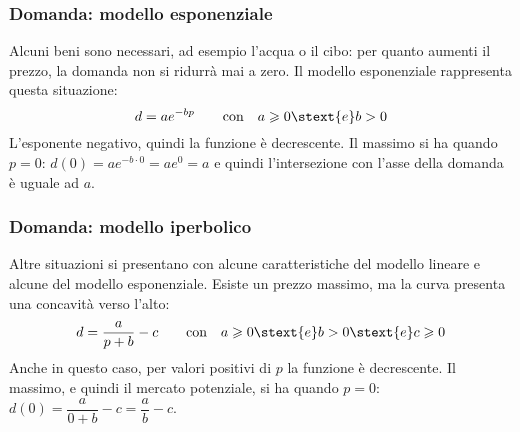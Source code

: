 \subsubsection{Domanda: modello esponenziale}

Alcuni beni sono necessari, ad esempio l'acqua o il cibo: per quanto aumenti 
il prezzo, la domanda non si ridurrà mai a zero.
Il modello esponenziale rappresenta questa situazione:
\[d= ae^{-bp} \qquad \text{con} \quad a \geqslant 0 \stext{ e } b > 0\]
L'esponente 
negativo, quindi la funzione è decrescente.
Il massimo si ha quando \(p = 0\): \(d(0) = ae^{-b\cdot 0} = ae^0 = a\) 
e quindi l'intersezione con l'asse della domanda è uguale ad \(a\).


\subsubsection{Domanda: modello iperbolico}

Altre situazioni si presentano con alcune caratteristiche del modello lineare 
e alcune del modello esponenziale. 
Esiste un prezzo massimo, ma la curva presenta una concavità verso l'alto:
\[d = \dfrac{a}{p+b}-c \qquad \text{con} \quad a \geqslant 0 \stext{ e } b 
> 0 \stext{ e } c \geqslant 0\]
Anche in questo caso, per valori positivi di \(p\) la funzione è decrescente.
Il massimo, e quindi il mercato potenziale, si ha quando 
\(p = 0\): \(d(0) = \dfrac{a}{0+b}-c = \dfrac{a}{b}-c\).


